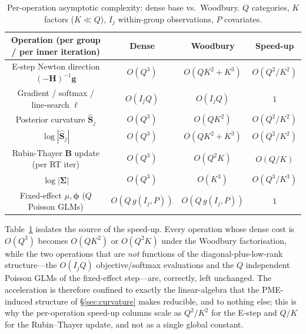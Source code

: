 \begin{table}[H]
\centering
\caption{Per-operation asymptotic complexity: dense base vs.\ Woodbury.
$Q$ categories, $K$ factors ($K\ll Q$), $I_j$ within-group observations, $P$ covariates.}
\label{tab:complexity-asymptotic}
\begin{tabular}{@{}cccc@{}}
\toprule
Operation (per group / per inner iteration) & Dense & Woodbury & Speed-up \\
\midrule
E-step Newton direction $(-\mathbf H)^{-1}\mathbf g$      & $O(Q^3)$   & $O(QK^2+K^3)$ & $O(Q^2/K^2)$ \\
Gradient / softmax / line-search $\ell$                   & $O(I_jQ)$  & $O(I_jQ)$     & $1$ \\
Posterior curvature $\widehat{\mathbf S}_j$              & $O(Q^3)$   & $O(QK^2)$     & $O(Q^2/K^2)$ \\
$\log|\widehat{\mathbf S}_j|$                            & $O(Q^3)$   & $O(QK^2+K^3)$ & $O(Q^2/K^2)$ \\
Rubin-Thayer $\mathbf B$ update (per RT iter)           & $O(Q^3)$   & $O(Q^2K)$     & $O(Q/K)$ \\
$\log|\bm\Sigma|$                                        & $O(Q^3)$   & $O(K^3)$      & $O(Q^3/K^3)$ \\
Fixed-effect $\mu,\bm\phi$ ($Q$ Poisson GLMs)            & $O(Q\,g(I_j,P))$ & $O(Q\,g(I_j,P))$ & $1$ \\
\bottomrule
\end{tabular}
\end{table}

Table~\ref{tab:complexity-asymptotic} isolates the source of the speed-up. Every operation
whose dense cost is $O(Q^3)$ becomes $O(QK^2)$ or $O(Q^2K)$ under the Woodbury
factorisation, while the two operations that are \emph{not} functions of the
diagonal-plus-low-rank structure---the $O(I_jQ)$ objective/softmax evaluations and the $Q$
independent Poisson GLMs of the fixed-effect step---are, correctly, left unchanged. The
acceleration is therefore confined to exactly the linear-algebra that the PME-induced
structure of \S\ref{sec:curvature} makes reducible, and to nothing else; this is why the
per-operation speed-up columns scale as $Q^2/K^2$ for the E-step and $Q/K$ for the
Rubin--Thayer update, and not as a single global constant.

